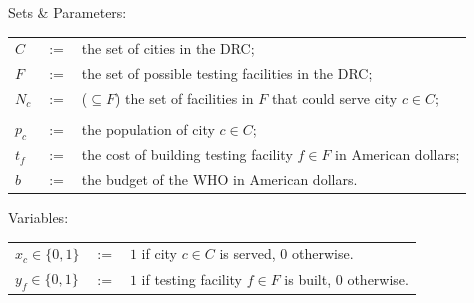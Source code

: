 \documentclass[12pt]{exam}
\begin{document}
\begin{questions}
\smallskip
Sets \& Parameters:

\begin{tabular}{lcl}
$C$ & $:=$ & the set of cities in the DRC; \\
$F$ & $:=$ & the set of possible testing facilities in the DRC; \\
$N_c$ & $:=$ & ($\subseteq F$) the set of facilities in $F$ that could serve city $c \in C$;
\\
\\
$p_{c}$ & $:=$ & the population of city $c \in C$;\\
$t_f$ & $:=$ & the cost of building testing facility $f \in F$ in American dollars;\\
$b$ & $:=$ & the budget of the WHO in American dollars.\\
\end{tabular}

Variables:

\begin{tabular}{lcl}
$x_c \in \{0,1\}$ & $:=$ & $1$ if city $c \in C$ is served, $0$ otherwise.\\
$y_f \in \{0,1\}$ & $:=$ & $1$ if testing facility $f \in F$ is built, $0$ otherwise.\\
\end{tabular}

\medskip

\end{questions}
\end{document}
